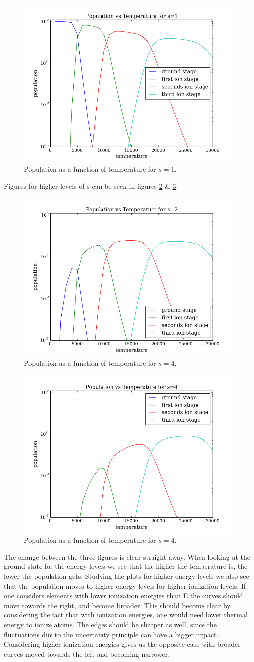 \documentclass{aa}   %
\begin{document}
\begin{figure}
 \includegraphics[width=.49\textwidth]{pop_vs_t_for_s1.png}
 \caption{Population as a function of temperature for $s = 1$.}
 \label{pop_vs_t_for_s1}
\end{figure}

Figures for higher levels of s can be seen in figures \ref{pop_vs_t_for_s2} \& \ref{pop_vs_t_for_s4}.
\begin{figure}
 \includegraphics[width=.49\textwidth]{pop_vs_t_for_s2.png}
 \caption{Population as a function of temperature for $s = 4$.}
 \label{pop_vs_t_for_s2}
\end{figure}

\begin{figure}
 \includegraphics[width=.49\textwidth]{pop_vs_t_for_s4.png}
 \caption{Population as a function of temperature for $s = 4$.}
 \label{pop_vs_t_for_s4}
\end{figure}

The change between the three figures is clear straight away. When looking at the ground state for the energy levels we see that the higher the temperature is, the lower the population gets. Studying the plots for higher energy levels we also see that the population moves to higher energy levels for higher ionization levels. 
If one considers elements with lower ionization energies than E the curves should move towards the right, and become broader. This should become clear by considering the fact that with ionization energies, one would need lower thermal energy to ionize atoms. The edges should be sharper as well, since the fluctuations due to the uncertainty principle can have a bigger impact.
Considering higher ionization energies gives us the opposite case with broader curves moved towards the left and becoming narrower.
\end{document}
